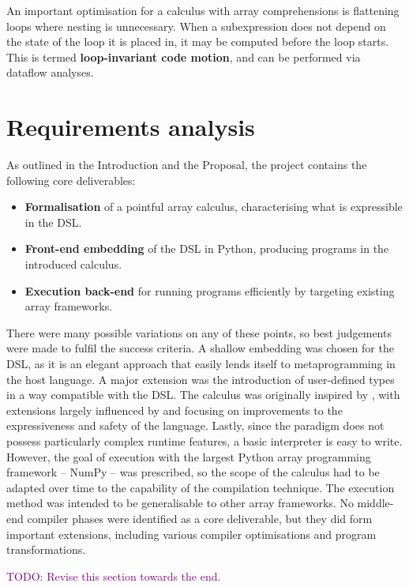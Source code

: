 An important optimisation for a calculus with array comprehensions is flattening loops where nesting is unnecessary. When a subexpression does not depend on the state of the loop it is placed in, it may be computed before the loop starts. This is termed \textbf{loop-invariant code motion}, and can be performed via dataflow analyses.

\section{Requirements analysis}
\label{requirements-analysis}

As outlined in the Introduction and the Proposal, the project contains the following core deliverables:
\begin{itemize}
    \item \textbf{Formalisation} of a pointful array calculus, characterising what is expressible in the DSL.
    \item \textbf{Front-end embedding} of the DSL in Python, producing programs in the introduced calculus.
    \item \textbf{Execution back-end} for running programs efficiently by targeting existing array frameworks.
\end{itemize}
There were many possible variations on any of these points, so best judgements were made to fulfil the success criteria. A shallow embedding was chosen for the DSL, as it is an elegant approach that easily lends itself to metaprogramming in the host language. A major extension was the introduction of user-defined types in a way compatible with the DSL. The calculus was originally inspired by \textcite{paszke2021getting}, with extensions largely influenced by \textcite{shaikhha2019efficient} and focusing on improvements to the expressiveness and safety of the language. Lastly, since the paradigm does not possess particularly complex runtime features, a basic interpreter is easy to write. However, the goal of execution with the largest Python array programming framework -- NumPy -- was prescribed, so the scope of the calculus had to be adapted over time to the capability of the compilation technique. The execution method was intended to be generalisable to other array frameworks. No middle-end compiler phases were identified as a core deliverable, but they did form important extensions, including various compiler optimisations and program transformations.

\begin{center}
    \textcolor{purple}{TODO: Revise this section towards the end.}
\end{center}

